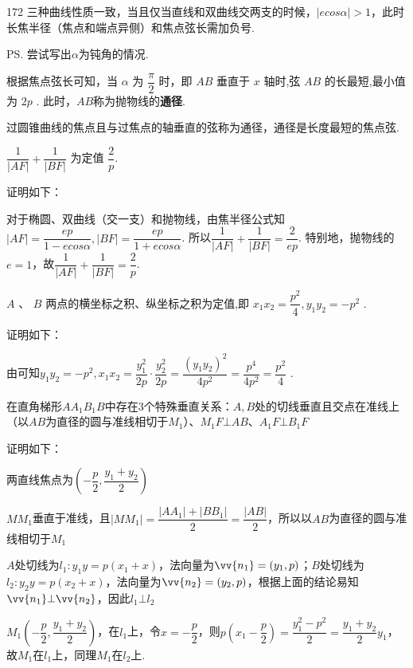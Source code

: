 \begin{dingautolist}{172}
    三种曲线性质一致，当且仅当直线和双曲线交两支的时候，$|ecos\alpha| > 1$，此时长焦半径（焦点和端点异侧）和焦点弦长需加负号. 

    \ps 尝试写出$\alpha$为钝角的情况.
    
    根据焦点弦长可知，当 $\alpha$ 为 $\dfrac{\pi}{2}$ 时，即 ${AB}$ 垂直于 $x$ 轴时,弦 ${AB}$ 的长最短,最小值为 ${2p}$ . 此时，${AB}$称为抛物线的\textbf{通径}.

    过圆锥曲线的焦点且与过焦点的轴垂直的弦称为通径，通径是长度最短的焦点弦.


    \item $\dfrac{1}{\left| AF\right| } + \dfrac{1}{\left| BF\right| }$ 为定值 $\dfrac{2}{p}$.

    证明如下：
    
    对于椭圆、双曲线（交一支）和抛物线，由焦半径公式知$\left| {AF}\right|  = \dfrac{ep}{1-ecos\alpha},\left| {BF}\right|  = \dfrac{ep}{1+ecos\alpha}$. 所以$\dfrac{1}{\left| AF\right| } + \dfrac{1}{\left| BF\right| } = \dfrac{2}{ep}$. 特别地，抛物线的$e = 1$，故$\dfrac{1}{\left| AF\right| } + \dfrac{1}{\left| BF\right| } = \dfrac{2}{p}$.
    
    \item $A$ 、 $B$ 两点的横坐标之积、纵坐标之积为定值,即 ${x}_{1}{x}_{2} = \dfrac{{p}^{2}}{4},{y}_{1}{y}_{2} =  - {p}^{2}$ .

    证明如下：
    
    由可知${y}_{1}{y}_{2} =  - {p}^{2},{x}_{1}{x}_{2} = \dfrac{{y}_{1}^{2}}{2p} \cdot  \dfrac{{y}_{2}^{2}}{2p} = \dfrac{{\left( {y}_{1}{y}_{2}\right) }^{2}}{4{p}^{2}} = \dfrac{{p}^{4}}{4{p}^{2}} = \dfrac{{p}^{2}}{4}$ . 

    \item 在直角梯形$AA_1B_1B$中存在3个特殊垂直关系：$A,B$处的切线垂直且交点在准线上（以$AB$为直径的圆与准线相切于$M_1$）、$M_1F \bot AB$、$A_1F \bot B_1F$
    
    证明如下：

    两直线焦点为$\left(-\dfrac{p}{2}, \dfrac{y_1+y_2}{2}\right)$

    $MM_1$垂直于准线，且$|MM_1| = \dfrac{|AA_1|+|BB_1|}{2} = \dfrac{|AB|}{2}$，所以以$AB$为直径的圆与准线相切于$M_1$

    $A$处切线为$l_1: y_1y = p(x_1+x)$，法向量为$\vv{n_1} = (y_1, p)$；$B$处切线为$l_2: y_2y = p(x_2+x)$，法向量为$\vv{n_2} = (y_2, p)$，根据上面的结论易知$\vv{n_1} \bot \vv{n_2}$，因此$l_1 \bot l_2$
    
    $M_1\left(-\dfrac{p}{2}, \dfrac{y_1+y_2}{2}\right)$，在$l_1$上，令$x = -\dfrac{p}{2}$，则$p\left(x_1-\dfrac{p}{2}\right) = \dfrac{y_1^2-p^2}{2} = \dfrac{y_1+y_2}{2}y_1$，故$M_1$在$l_1$上，同理$M_1$在$l_2$上.


\end{dingautolist}
